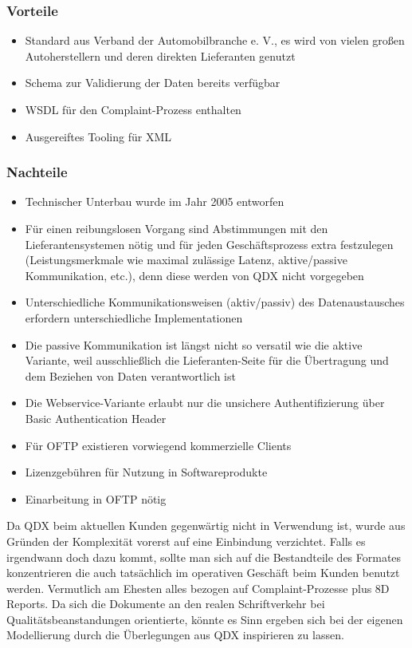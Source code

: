 

\subsubsection*{Vorteile}
\begin{itemize}
    \item Standard aus Verband der Automobilbranche e. V., es wird von vielen großen Autoherstellern und deren direkten Lieferanten genutzt
    \item Schema zur Validierung der Daten bereits verfügbar
    \item WSDL für den Complaint-Prozess enthalten
    \item Ausgereiftes Tooling für XML
\end{itemize}

\subsubsection*{Nachteile}
\begin{itemize}
    \item Technischer Unterbau wurde im Jahr 2005 entworfen
    \item Für einen reibungslosen Vorgang sind Abstimmungen mit den Lieferantensystemen nötig und für jeden Geschäftsprozess extra festzulegen (Leistungsmerkmale wie maximal zulässige Latenz, aktive/passive Kommunikation, etc.), denn diese werden von QDX nicht vorgegeben
    \item Unterschiedliche Kommunikationsweisen (aktiv/passiv) des Datenaustausches erfordern unterschiedliche Implementationen
    \item Die passive Kommunikation ist längst nicht so versatil wie die aktive Variante, weil ausschließlich die Lieferanten-Seite für die Übertragung und dem Beziehen von Daten verantwortlich ist
    \item Die Webservice-Variante erlaubt nur die unsichere Authentifizierung über Basic Authentication Header
    \item Für OFTP existieren vorwiegend kommerzielle Clients
    \item Lizenzgebühren für Nutzung in Softwareprodukte
    \item Einarbeitung in OFTP nötig
\end{itemize}

Da QDX beim aktuellen Kunden gegenwärtig nicht in Verwendung ist, wurde aus Gründen der Komplexität vorerst auf eine Einbindung verzichtet.
Falls es irgendwann doch dazu kommt, sollte man sich auf die Bestandteile des Formates konzentrieren die auch tatsächlich im operativen Geschäft beim Kunden benutzt werden.
Vermutlich am Ehesten alles bezogen auf Complaint-Prozesse plus 8D Reports.
Da sich die Dokumente an den realen Schriftverkehr bei Qualitätsbeanstandungen orientierte, könnte es Sinn ergeben sich bei der eigenen Modellierung durch die Überlegungen aus QDX inspirieren zu lassen.